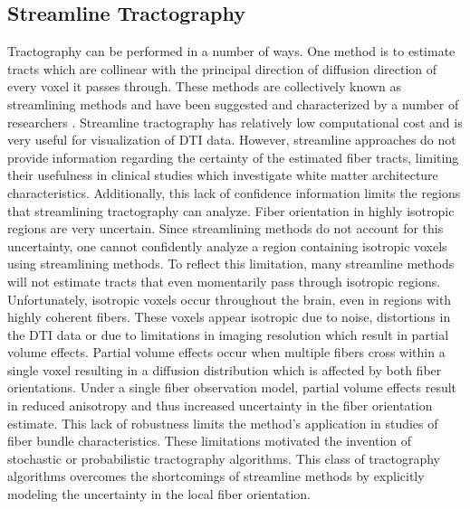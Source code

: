 \subsection{Streamline Tractography}

Tractography can be performed in a number of ways. One method is to estimate tracts which are collinear with the principal direction of diffusion direction of every voxel it passes through.  These methods are collectively known as streamlining methods and have been suggested and characterized by a number of researchers \cite{Mori99, Basser00}.  Streamline tractography has relatively low computational cost and is very useful for visualization of DTI data.  However, streamline approaches do not provide information regarding the certainty of the estimated fiber tracts, limiting their usefulness in clinical studies which investigate white matter architecture characteristics.  Additionally, this lack of confidence information limits the regions that streamlining tractography can analyze.  Fiber orientation in highly isotropic regions are very uncertain.  Since streamlining methods do not account for this uncertainty, one cannot confidently analyze a region containing isotropic voxels using streamlining methods.  To reflect this limitation, many streamline methods will not estimate tracts that even momentarily pass through isotropic regions.  Unfortunately, isotropic voxels occur throughout the brain, even in regions with highly coherent fibers.  These voxels appear isotropic due to noise, distortions in the DTI data or due to limitations in imaging resolution which result in partial volume effects.  Partial volume effects occur when multiple fibers cross within a single voxel resulting in a diffusion distribution which is affected by both fiber orientations.  Under a single fiber observation model, partial volume effects result in reduced anisotropy and thus increased uncertainty in the fiber orientation estimate.  This lack of robustness limits the method's application in studies of fiber bundle characteristics.  These limitations motivated the invention of stochastic or probabilistic tractography algorithms.  This class of tractography algorithms overcomes the shortcomings of streamline methods by explicitly modeling the uncertainty in the local fiber orientation.

